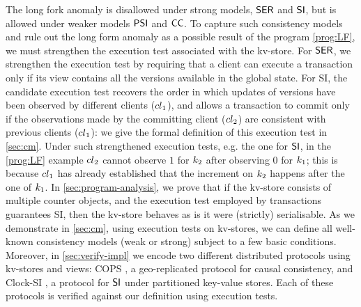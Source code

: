 The long fork anomaly is disallowed under strong models, \eg \(\mathsf{SER}\) and 
\(\mathsf{SI}\), 
but is allowed under weaker models \eg \(\mathsf{PSI}\) and \(\mathsf{CC}\). 
To capture such consistency models and rule out the long form anomaly as a possible result 
of the program \eqref{prog:LF}, we must strengthen the execution test associated with the kv-store. 
For \(\mathsf{SER}\), we strengthen the execution test by requiring that a client can execute a transaction 
only if its view contains all the versions available in the global state. 
For SI, 
the candidate execution test recovers the order in which 
updates of versions have been observed by different clients (\eg ${cl}_1$), 
and allows a transaction to commit only if the observations made by the committing client (\eg ${cl}_2$) 
are consistent with previous clients (\ie ${cl}_1$): we give the formal definition of this execution test 
in \cref{sec:cm}.
Under such strengthened execution tests, e.g. the one for \(\mathsf{SI}\), in the \eqref{prog:LF} example ${cl}_2$ cannot
observe $1$ for $k_2$ after observing $0$ for $k_1$; 
this is because ${cl}_1$ has already established that the increment on $k_2$ happens after 
the one of $k_1$. 
In \cref{sec:program-analysis}, we prove that if the kv-store consists of multiple counter objects, and the execution test employed by transactions guarantees SI, then the kv-store 
behaves as is it were (strictly) serialisable.
As we demonstrate in \cref{sec:cm}, using execution tests on kv-stores, we can define all well-known consistency models (weak or strong) subject to a few basic conditions. 
Moreover, in \cref{sec:verify-impl} we encode two different distributed protocols using kv-stores and views: COPS \cite{cops}, 
a geo-replicated protocol for causal consistency, and Clock-SI \cite{clocksi}, a protocol for \(\mathsf{SI}\) under partitioned key-value stores.
Each of these protocols is verified against our definition using execution tests.
